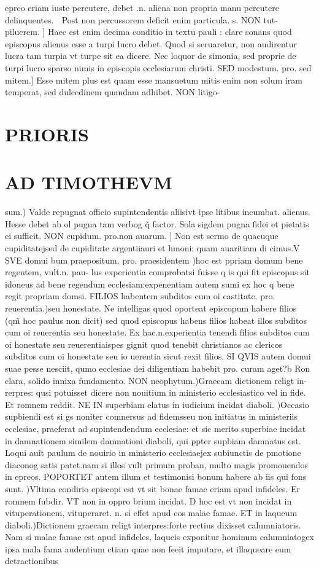 \documentclass{article}
\begin{document}
\begin{pages}
epreo eriam iuste percutere, debet .n. aliena non propria manu percutere delinquentes.  Post non percussorem deficit enim particula. s. NON tut- pilucrem. ] Haec est enim decima conditio in textu pauli : clare sonans quod episcopus alienus esse a turpi lucro debet. Quod si seruaretur, non audirentur lucra tam turpia vt turpe sit ea dicere. Nec loquor de simonia, sed proprie de turpi lucro sparso nimis in episcopis ecclesiarum christi. SED modestum. pro. sed mitem.] Esse mitem plus est quam esse mansuetum mitis enim non solum iram temperat, sed dulcedinem quandam adhibet. NON litigo-  \pend
\section*{PRIORIS }
\section*{AD TIMOTHEVM }\pstart sum.) Valde repugnat officio supintendentis aliisivt ipse litibus incumbat. alienus. Hesse debet ab ol pugna tam verbog q̃ factor. Sola sigdem pugna fidei et pietatis ei sufficit. NON cupidum. pro.non auarum. ] Non est sermo de quacuque cupiditatejsed de cupiditate argentiiauri et hmoni: quam auaritiam di cimus.V SVE domui bum praepositum, pro. praesidentem )hoc est ppriam domum bene regentem, vult.n. pau- lus experientia comprobatsi fuisse q is qui fit episcopus sit idoneus ad bene regendum ecclesiam:expenentiam autem sumi ex hoc q bene regit propriam domsi. FILIOS habentem subditos cum oi castitate. pro. reuerentia.)seu honestate. Ne intelligas quod oporteat episcopum habere filios (qm̃ hoc paulus non dicit) sed quod episcopus habens filios habeat illos subditos cum oi reuerentia seu honestate. Ex hac.n.experientia tenendi filios subditos cum oi honestate seu reuerentiaispes gignit quod tenebit christianos ac clericos subditos cum oi honestate seu io uerentia sicut rexit filios. SI QVIS autem domui suae pesse nesciit, qumo ecclesiae dei diligentiam habebit pro. curam aget?b Ron clara, solido innixa fundamento. NON neophytum.)Graecam dictionem religt in- rerpres: qusi potuisset dicere non nouitium in ministerio ecclesiastico vel in fide. Et romnem reddit. NE IN superbiam elatus in iudicium incidat diaboli. )Occasio supbiendi est si gs noniter comnersus ad fidemsseu non initiatus in ministeriis ecclesiae, praeferat ad supintendendum ecclesiae: et sic merito superbiae incidat in damnationem similem damnationi diaboli, qui ppter supbiam damnatus est. Loqui auĩt paulum de nouirio in ministerio ecclesiaejex subiunctis de pmotione diaconog satis patet.nam si illos vult primum proban, multo magis promouendos in epreos. POPORTET autem illum et testimonisi bonum habere ab iis qui fons sunt. )Vltima condirio episcopi est vt sit bonae famae eriam apud infideles. Er romnem fubdir. VT non in oppro brium incidat. D hoc est vt non incidat in vituperationem, vituperaret. n. si effet apud eos malae famae. ET in laqueum diaboli.)Dictionem graecam religt interpres:forte rectius dixisset calumniatoris. Nam si malae famae est apud infideles, laqueis exponitur hominum calumniatogex ipsa mala fama audentium ctiam quae non feeit imputare, et illaqueare eum detractionibus 
\end{pages}
\end{document}
